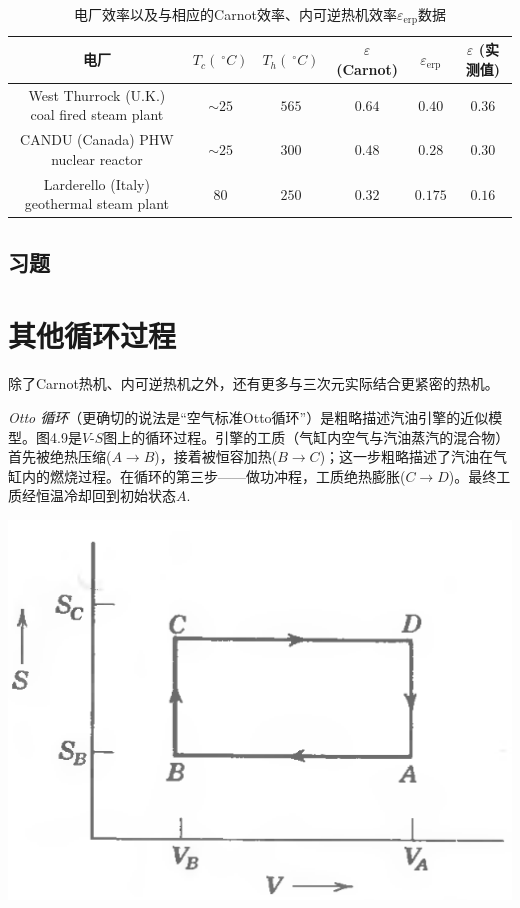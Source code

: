 \begin{table}[h]

\caption{电厂效率以及与相应的Carnot效率、内可逆热机效率$\varepsilon_{\text{erp}}$数据}
\begin{tabular}{c c c c c c}
\toprule
\textbf{电厂} & $T_c (\ ^\circ C)$ & $T_h (\ ^\circ C)$ & $\varepsilon$ (Carnot) & $\varepsilon_{\text{erp}}$ & $\varepsilon$ (实测值) \\
\midrule
West Thurrock  (U.K.)  coal fired steam plant & $\sim 25$ & $565$ & $0.64$ & $0.40$ & 0.36 \\
CANDU (Canada) PHW nuclear reactor & $\sim 25$ & $300$ & $0.48$ & $0.28$ & $0.30$ \\
Larderello (Italy) geothermal steam plant & $80$ & $250$ & $0.32$ & $0.175$ & $0.16$ \\
\bottomrule
\end{tabular}
\end{table}

\subsection*{习题}

\section{其他循环过程}
\label{equ4.10}
除了Carnot热机、内可逆热机之外，还有更多与三次元实际结合更紧密的热机。

{\it Otto 循环}（更确切的说法是“空气标准Otto循环”）是粗略描述汽油引擎的近似模型。图4.9是$V\text{-}S$图上的循环过程。引擎的工质（气缸内空气与汽油蒸汽的混合物）首先被绝热压缩($A \rightarrow B$)，接着被恒容加热($B \rightarrow C$)；这一步粗略描述了汽油在气缸内的燃烧过程。在循环的第三步——做功冲程，工质绝热膨胀($C \rightarrow D$)。最终工质经恒温冷却回到初始状态$A$.

{
	\centering
	\includegraphics[scale=0.7]{Pictures/fig4.9.png}
}

